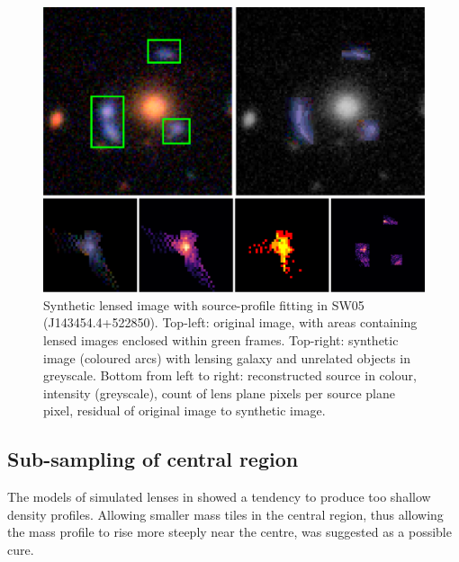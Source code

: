 \begin{figure}
  \includegraphics[width=\linewidth]{img/new_synth_img_detailed}
  \caption{Synthetic lensed image with source-profile fitting in SW05
    (J143454.4+522850). Top-left: original image, with areas
    containing lensed images enclosed within green frames.  Top-right:
    synthetic image (coloured arcs) with lensing galaxy and unrelated
    objects in greyscale.  Bottom from left to right: reconstructed
    source in colour, intensity (greyscale), count of lens plane
    pixels per source plane pixel, residual of original image to
    synthetic image.}
  \label{fig:synthimg}
\end{figure}

\subsection{Sub-sampling of central region}\label{subsec:hires}

The models of simulated lenses in \cite{2015MNRAS.447.2170K} showed a
tendency to produce too shallow density profiles.
Allowing smaller mass tiles in the
central region, thus allowing the mass profile to rise more steeply
near the centre, was suggested as a possible cure.


